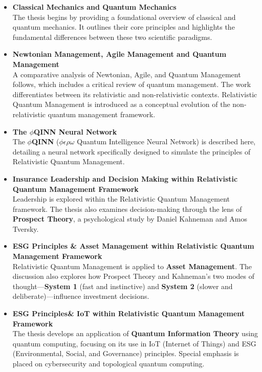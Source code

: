 \documentclass{article}
\begin{document}
 \begin{itemize}[leftmargin=*,label=\textbf{\textbullet}]
    \item \textbf{Classical Mechanics and Quantum Mechanics}\\
    The thesis begins by providing a foundational overview of classical and quantum mechanics. It outlines their core principles and highlights the fundamental differences between these two scientific paradigms.

    \item \textbf{Newtonian Management, Agile Management and Quantum Management}\\
    A comparative analysis of Newtonian, Agile, and Quantum Management follows, which includes a critical review of quantum management. The work differentiates between its relativistic and non-relativistic contexts. Relativistic Quantum Management is introduced as a conceptual evolution of the non-relativistic quantum management framework.

    \item \textbf{The $\phi$QINN Neural Network}\\
    The \textbf{$\phi$QINN} ($\phi\epsilon\rho\omega$ Quantum Intelligence Neural Network) is described here, detailing a neural network specifically designed to simulate the principles of Relativistic Quantum Management.

    \item \textbf{Insurance Leadership and Decision Making within Relativistic Quantum Management Framework}\\
    Leadership is explored within the Relativistic Quantum Management framework. The thesis also examines decision-making through the lens of \textbf{Prospect Theory}, a psychological study by Daniel Kahneman and Amos Tversky.

    \item \textbf{ESG Principles \& Asset Management within Relativistic Quantum Management Framework}\\
    Relativistic Quantum Management is applied to \textbf{Asset Management}. The discussion also explores how Prospect Theory and Kahneman's two modes of thought—\textbf{System 1} (fast and instinctive) and \textbf{System 2} (slower and deliberate)—influence investment decisions.

    \item \textbf{ESG Principles\& IoT within Relativistic Quantum Management Framework}\\
    The thesis develops an application of \textbf{Quantum Information Theory} using quantum computing, focusing on its use in IoT (Internet of Things) and ESG (Environmental, Social, and Governance) principles. Special emphasis is placed on cybersecurity and topological quantum computing.


\end{itemize}
\end{document}
